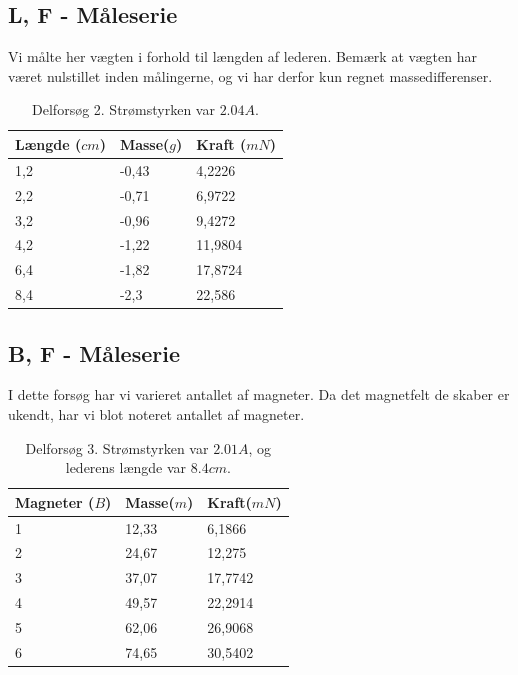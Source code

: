 \documentclass[10pt,a4paper]{article}
\theoremstyle{break}
\theoremstyle{nonumberplain}
\begin{document}
\pagebreak
\subsection{L, F - Måleserie}
Vi målte her vægten i forhold til længden af lederen. 
Bemærk at vægten har været nulstillet inden målingerne, og vi har derfor kun regnet massedifferenser. 

\begin{table}[h]
\centering

\label{my-label}
\begin{tabular}{|l|ll|}
\hline
\textbf{Længde ($cm$)} & \textbf{Masse($g$)} & \textbf{Kraft ($mN$)} \\ \hline
1,2                    & -0,43               & 4,2226                \\
2,2                    & -0,71               & 6,9722                \\
3,2                    & -0,96               & 9,4272                \\
4,2                    & -1,22               & 11,9804               \\
6,4                    & -1,82               & 17,8724               \\
8,4                    & -2,3                & 22,586               \\
\hline
\end{tabular}
\caption{Delforsøg 2. Strømstyrken var $2.04A$.}
\end{table}

\subsection{B, F - Måleserie}
I dette forsøg har vi varieret antallet af magneter. 
Da det magnetfelt de skaber er ukendt, har vi blot noteret antallet af magneter.

\begin{table}[h]
\centering

\label{my-label}
\begin{tabular}{|l|ll|}
\hline
\textbf{Magneter ($B$)} & \textbf{Masse($m$)} & \textbf{Kraft($mN$)} \\ \hline
1                       & 12,33               & 6,1866               \\
2                       & 24,67               & 12,275               \\
3                       & 37,07               & 17,7742              \\
4                       & 49,57               & 22,2914              \\
5                       & 62,06               & 26,9068              \\
6                       & 74,65               & 30,5402   			\\
\hline          
\end{tabular}

\caption{Delforsøg 3. Strømstyrken var $2.01 A$, og lederens længde var $8.4cm$.}
\end{table}
\end{document}
